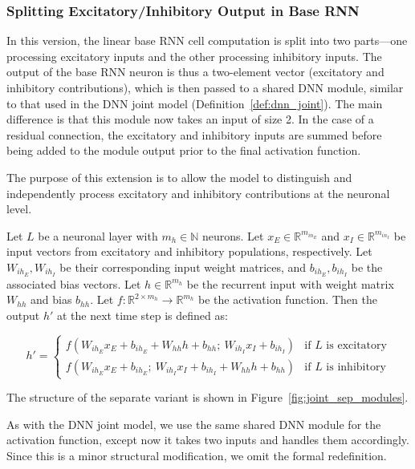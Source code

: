 \subsubsection{Splitting Excitatory/Inhibitory Output in Base RNN}
\label{subsubsec:dnn_separate}
In this version, the linear base RNN cell computation is split into two parts—one processing excitatory inputs and the other processing inhibitory inputs. The output of the base RNN neuron is thus a two-element vector (excitatory and inhibitory contributions), which is then passed to a shared DNN module, similar to that used in the DNN joint model (Definition~\ref{def:dnn_joint}). The main difference is that this module now takes an input of size 2. In the case of a residual connection, the excitatory and inhibitory inputs are summed before being added to the module output prior to the final activation function.

The purpose of this extension is to allow the model to distinguish and independently process excitatory and inhibitory contributions at the neuronal level.

\begin{defn}
Let $L$ be a neuronal layer with $m_h \in \mathbb{N}$ neurons. Let $x_E \in \mathbb{R}^{m_{in_E}}$ and $x_I \in \mathbb{R}^{m_{in_I}}$ be input vectors from excitatory and inhibitory populations, respectively. Let $W_{ih_E}, W_{ih_I}$ be their corresponding input weight matrices, and $b_{ih_E}, b_{ih_I}$ be the associated bias vectors. Let $h \in \mathbb{R}^{m_h}$ be the recurrent input with weight matrix $W_{hh}$ and bias $b_{hh}$. Let $f: \mathbb{R}^{2 \times m_h} \to \mathbb{R}^{m_h}$ be the activation function. Then the output $h'$ at the next time step is defined as:

\begin{equation*}
    h' = 
    \begin{cases}
        f\left(W_{ih_E}x_E + b_{ih_E} + W_{hh}h + b_{hh};\ W_{ih_I}x_I + b_{ih_I}\right) & \text{if $L$ is excitatory} \\
        f\left(W_{ih_E}x_E + b_{ih_E};\ W_{ih_I}x_I + b_{ih_I} + W_{hh}h + b_{hh}\right) & \text{if $L$ is inhibitory}
    \end{cases}
\end{equation*}
\end{defn}
\label{def:separate_base_rnn}

The structure of the separate variant is shown in Figure~\ref{fig:joint_sep_modules}.

As with the DNN joint model, we use the same shared DNN module for the activation function, except now it takes two inputs and handles them accordingly. Since this is a minor structural modification, we omit the formal redefinition.

